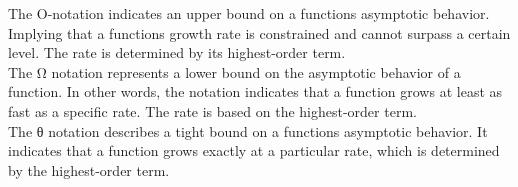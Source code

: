 \documentclass[
]{article}
\begin{document}
The O-notation indicates an upper bound on a function\textquotesingle s
asymptotic behavior. Implying that a function\textquotesingle s growth
rate is constrained and cannot surpass a certain level. The rate is
determined by its highest-order term.\\
The Ω notation represents a lower bound on the asymptotic behavior of a
function. In other words, the notation indicates that a function grows
at least as fast as a specific rate. The rate is based on the
highest-order term.\\
The θ notation describes a tight bound on a function\textquotesingle s
asymptotic behavior. It indicates that a function grows exactly at a
particular rate, which is determined by the highest-order term.
\end{document}
